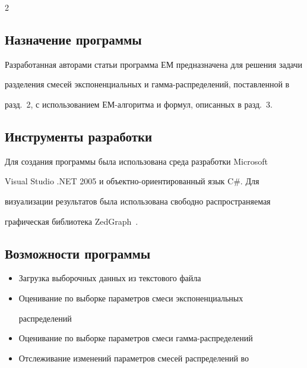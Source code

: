 \begin{multicols}{2}
\subsection{Назначение программы} %





Разработанная авторами статьи программа ЕМ предназначена для решения задачи


разделения смесей экспоненциальных и гамма-распределений, поставленной в


разд.~2, с использованием ЕМ-ал\-го\-рит\-ма и формул, описанных в разд.~3.





\subsection{Инструменты разработки} %





Для создания программы была использована среда разработки Microsoft


Visual Studio .NET 2005 и объектно-ориентированный язык C\#. Для


визуализации результатов была использована свободно распространяемая


графическая библиотека ZedGraph~\cite{7bat}.








\subsection{Возможности  программы} %





\noindent


\begin{itemize}


\item Загрузка выборочных данных из текстового файла


\item Оценивание по выборке параметров смеси экспоненциальных


распределений


\item Оценивание по выборке параметров смеси гамма-распределений


\item Отслеживание изменений параметров смесей распределений во



\end{itemize}
\end{multicols}
